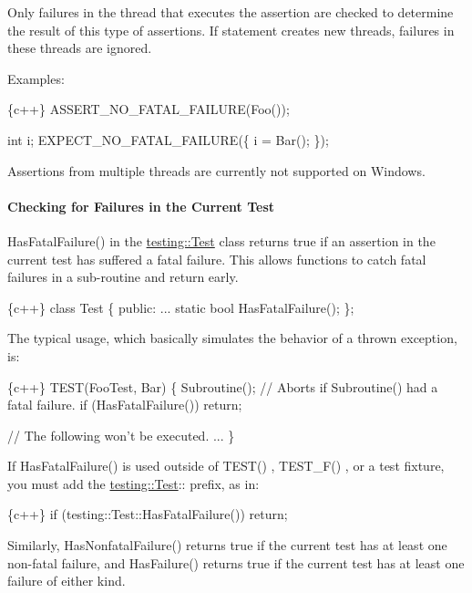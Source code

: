 Only failures in the thread that executes the assertion are checked to determine the result of this type of assertions. If {\ttfamily statement} creates new threads, failures in these threads are ignored.

Examples\+:


\begin{DoxyCode}
\{c++\}
ASSERT\_NO\_FATAL\_FAILURE(Foo());

int i;
EXPECT\_NO\_FATAL\_FAILURE(\{
  i = Bar();
\});
\end{DoxyCode}


Assertions from multiple threads are currently not supported on Windows.

\paragraph*{Checking for Failures in the Current Test}

{\ttfamily Has\+Fatal\+Failure()} in the {\ttfamily \mbox{\hyperlink{classtesting_1_1Test}{testing\+::\+Test}}} class returns {\ttfamily true} if an assertion in the current test has suffered a fatal failure. This allows functions to catch fatal failures in a sub-\/routine and return early.


\begin{DoxyCode}
\{c++\}
class Test \{
 public:
  ...
  static bool HasFatalFailure();
\};
\end{DoxyCode}


The typical usage, which basically simulates the behavior of a thrown exception, is\+:


\begin{DoxyCode}
\{c++\}
TEST(FooTest, Bar) \{
  Subroutine();
  // Aborts if Subroutine() had a fatal failure.
  if (HasFatalFailure()) return;

  // The following won't be executed.
  ...
\}
\end{DoxyCode}


If {\ttfamily Has\+Fatal\+Failure()} is used outside of {\ttfamily T\+E\+S\+T()} , {\ttfamily T\+E\+S\+T\+\_\+\+F()} , or a test fixture, you must add the {\ttfamily \mbox{\hyperlink{classtesting_1_1Test}{testing\+::\+Test}}\+:\+:} prefix, as in\+:


\begin{DoxyCode}
\{c++\}
if (testing::Test::HasFatalFailure()) return;
\end{DoxyCode}


Similarly, {\ttfamily Has\+Nonfatal\+Failure()} returns {\ttfamily true} if the current test has at least one non-\/fatal failure, and {\ttfamily Has\+Failure()} returns {\ttfamily true} if the current test has at least one failure of either kind.

